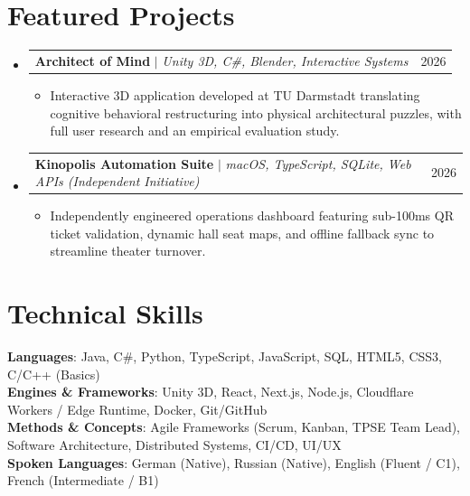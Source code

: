 \documentclass[letterpaper,10pt]{article}
\makeatletter
\newcommand{\resumeItem}[1]{
  \item\small{
    {#1 \vspace{-2pt}}
  }
}
\newcommand{\resumeProjectHeading}[2]{
    \vspace{-1pt}\item
    \begin{tabular*}{0.98\textwidth}{l@{\extracolsep{\fill}}r}
      \small#1 & \small #2 \\
    \end{tabular*}\vspace{-5pt}
}
\newcommand{\resumeSubHeadingListStart}{\begin{itemize}[leftmargin=0.0in, label={}]}
\newcommand{\resumeSubHeadingListEnd}{\end{itemize}}
\newcommand{\resumeItemListStart}{\begin{itemize}[leftmargin=0.15in, label=\raisebox{0.25ex}{\tiny$\bullet$}]}
\newcommand{\resumeItemListEnd}{\end{itemize}\vspace{-3pt}}
\makeatother
\begin{document}
\section{Featured Projects}
  \resumeSubHeadingListStart
    \resumeProjectHeading
      {\textbf{Architect of Mind} $|$ \emph{Unity 3D, C\#, Blender, Interactive Systems}}{2026}
      \resumeItemListStart
        \resumeItem{Interactive 3D application developed at TU Darmstadt translating cognitive behavioral restructuring into physical architectural puzzles, with full user research and an empirical evaluation study.}
      \resumeItemListEnd
    \resumeProjectHeading
      {\textbf{Kinopolis Automation Suite} $|$ \emph{macOS, TypeScript, SQLite, Web APIs (Independent Initiative)}}{2026}
      \resumeItemListStart
        \resumeItem{Independently engineered operations dashboard featuring sub-100ms QR ticket validation, dynamic hall seat maps, and offline fallback sync to streamline theater turnover.}
      \resumeItemListEnd
  \resumeSubHeadingListEnd
\vspace{-3pt}

\section{Technical Skills}
 \begin{itemize}[leftmargin=0.15in, label={}]
    \small{\item{
     \textbf{Languages}: Java, C\#, Python, TypeScript, JavaScript, SQL, HTML5, CSS3, C/C++ (Basics) \\
     \textbf{Engines \& Frameworks}: Unity 3D, React, Next.js, Node.js, Cloudflare Workers / Edge Runtime, Docker, Git/GitHub \\
     \textbf{Methods \& Concepts}: Agile Frameworks (Scrum, Kanban, TPSE Team Lead), Software Architecture, Distributed Systems, CI/CD, UI/UX \\
     \textbf{Spoken Languages}: German (Native), Russian (Native), English (Fluent / C1), French (Intermediate / B1)
    }}
 \end{itemize}
\end{document}
